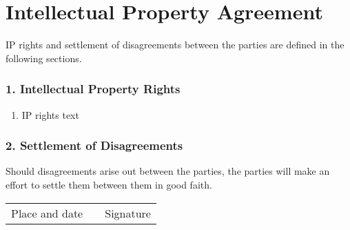 
\section*{Intellectual Property Agreement}

IP rights and settlement of disagreements between the parties are defined in the following sections.


\subsubsection*{1. Intellectual Property Rights} 

\begin{enumerate}[topsep=0pt,itemsep=0ex,partopsep=1ex,parsep=1ex]
\item IP rights text
\end{enumerate}

\subsubsection*{2. Settlement of Disagreements}

Should disagreements arise out between the parties, the parties will make an effort to settle them between them in good faith.



\vspace{3cm}

\begin{tabular}{ p{4.5cm} p{1cm} p{4.5cm} }
  \cline{1-1} \cline{3-3}
  Place and date & & Signature \\
\end{tabular}
